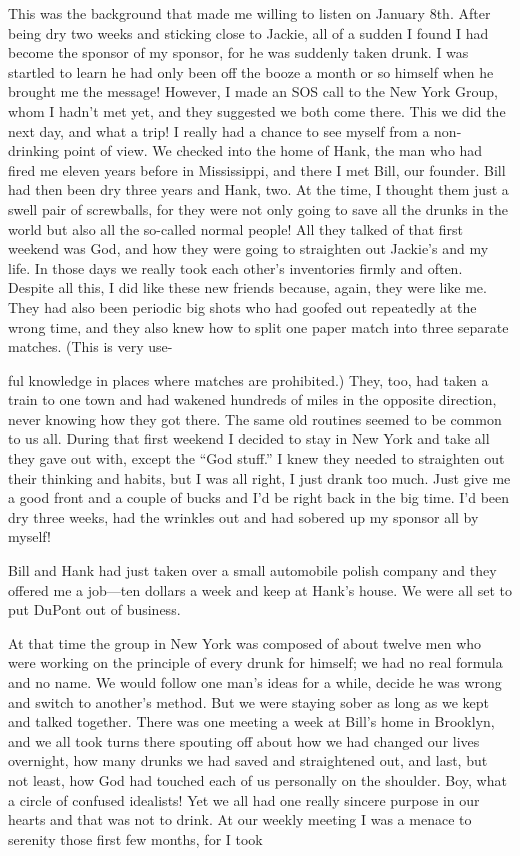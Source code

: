 This was the background that made me willing to listen on January 8th. After being dry two weeks and sticking close to Jackie, all of a sudden I found I had become the sponsor of my sponsor, for he was suddenly taken drunk. I was startled to learn he had only been off the booze a month or so himself when he brought me the message! However, I made an SOS call to the New York Group, whom I hadn’t met yet, and they suggested we both come there. This we did the next day, and what a trip! I really had a chance to see myself from a non-drinking point of view. We checked into the home of Hank, the man who had fired me eleven years before in Mississippi, and there I met Bill, our founder. Bill had then been dry three years and Hank, two. At the time, I thought them just a swell pair of screwballs, for they were not only going to save all the drunks in the world but also all the so-called normal people! All they talked of that first weekend was God, and how they were going to straighten out Jackie’s and my life. In those days we really took each other’s inventories firmly and often. Despite all this, I did like these new friends because, again, they were like me. They had also been periodic big shots who had goofed out repeatedly at the wrong time, and they also knew how to split one paper match into three separate matches. (This is very use-

ful knowledge in places where matches are prohibited.) They, too, had taken a train to one town and had wakened hundreds of miles in the opposite direction, never knowing how they got there. The same old routines seemed to be common to us all. During that first weekend I decided to stay in New York and take all they gave out with, except the “God stuff.” I knew they needed to straighten out their thinking and habits, but I was all right, I just drank too much. Just give me a good front and a couple of bucks and I’d be right back in the big time. I’d been dry three weeks, had the wrinkles out and had sobered up my sponsor all by myself!

Bill and Hank had just taken over a small automobile polish company and they offered me a job—ten dollars a week and keep at Hank’s house. We were all set to put DuPont out of business.

At that time the group in New York was composed of about twelve men who were working on the principle of every drunk for himself; we had no real formula and no name. We would follow one man’s ideas for a while, decide he was wrong and switch to another’s method. But we were staying sober as long as we kept and talked together. There was one meeting a week at Bill’s home in Brooklyn, and we all took turns there spouting off about how we had changed our lives overnight, how many drunks we had saved and straightened out, and last, but not least, how God had touched each of us personally on the shoulder. Boy, what a circle of confused idealists! Yet we all had one really sincere purpose in our hearts and that was not to drink. At our weekly meeting I was a menace to serenity those first few months, for I took

